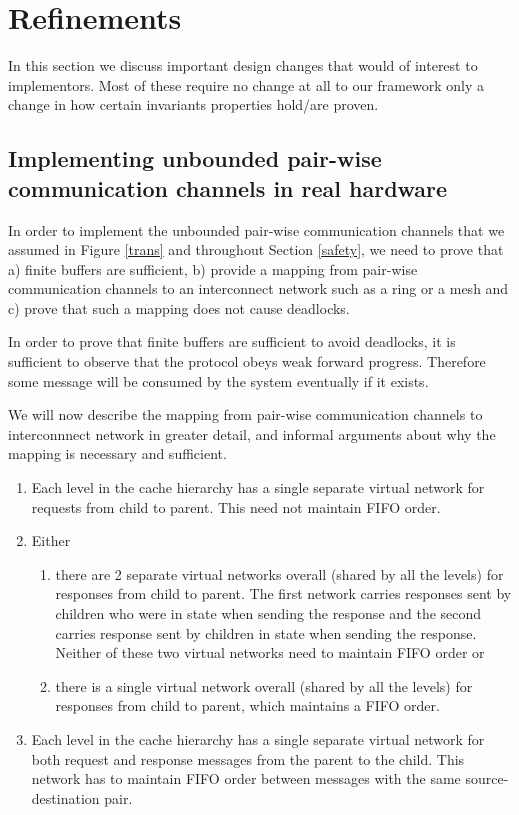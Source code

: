 \section{Refinements}
\label{sec:Refinements}

In this section we discuss important design changes that would of interest to
implementors. Most of these require no change at all to our framework only a
change in how certain invariants properties hold/are proven.

\subsection{Implementing unbounded pair-wise communication channels in real hardware}

In order to implement the unbounded pair-wise communication channels that we
assumed in Figure \ref{trans} and throughout Section \ref{safety}, we need
to prove that a) finite buffers are sufficient, b) provide a mapping from
pair-wise communication channels to an interconnect network such as a ring or a
mesh and c) prove that such a mapping does not cause deadlocks.

In order to prove that finite buffers are sufficient to avoid deadlocks, it is
sufficient to observe that the protocol obeys weak forward progress. Therefore
some message will be consumed by the system eventually if it exists.

We will now describe the mapping from pair-wise communication channels to
interconnnect network in greater detail, and informal arguments about why the
mapping is necessary and sufficient.

\begin{enumerate}
\item Each level in the cache hierarchy has a single separate virtual network
for requests from child to parent. This need not maintain FIFO order.
\item Either
\begin{enumerate}
\item there are 2 separate virtual networks overall (shared by all the levels)
for responses from child to parent. The first network carries responses sent by
children who were in state \Mo{} when sending the response and the second
carries response sent by children in state \Sh{} when sending the response.
Neither of these two virtual networks need to maintain FIFO order or
\item there is a single virtual network overall (shared by all the levels) for
responses from child to parent, which maintains a FIFO order.
\end{enumerate}
\item Each level in the cache hierarchy has a single separate virtual network
for both request and response messages from the parent to the child. This
network has to maintain FIFO order between messages with the same
source-destination pair.
\end{enumerate}

